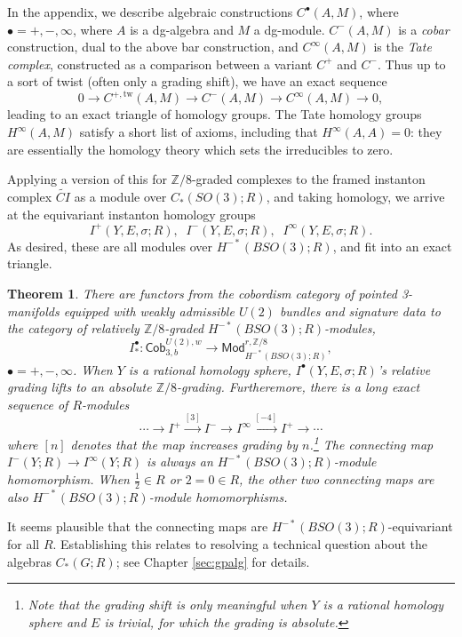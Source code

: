 \documentclass{memo-l}
\newtheorem{theorem}{Theorem}[chapter]
\theoremstyle{definition}
\theoremstyle{remark}
\numberwithin{section}{chapter}
\numberwithin{equation}{chapter}
\begin{document}
In the appendix, we describe algebraic constructions $C^\bullet(A,M)$, where $\bullet = +, -, \infty$, where $A$ is a dg-algebra and $M$ a dg-module. $C^-(A,M)$ is a \emph{cobar} construction, dual to the above bar construction, and $C^\infty(A,M)$ is the \emph{Tate complex}, constructed as a comparison between a variant $C^+$ and $C^-$. Thus up to a sort of twist (often only a grading shift), we have an exact sequence $$0 \to C^{+,\text{tw}}(A,M) \to C^-(A,M) \to C^\infty(A,M) \to 0,$$ leading to an exact triangle of homology groups. The Tate homology groups $H^\infty(A,M)$ satisfy a short list of axioms, including that $H^\infty(A,A) = 0$: they are essentially the homology theory which sets the irreducibles to zero.

Applying a version of this for $\mathbb Z/8$-graded complexes to the framed instanton complex $\widetilde{CI}$ as a module over $C_*(SO(3);R)$, and taking homology, we arrive at the equivariant instanton homology groups $$I^+(Y,E,\sigma;R),\;\; I^-(Y,E,\sigma;R),\;\; I^\infty(Y,E,\sigma;R).$$ As desired, these are all modules over $H^{-*}(BSO(3);R)$, and fit into an exact triangle. 

\begin{theorem}There are functors from the cobordism category of pointed 3-manifolds equipped with weakly admissible $U(2)$ bundles and signature data to the category of relatively $\mathbb Z/8$-graded $H^{-*}(BSO(3);R)$-modules, $$I^\bullet_*: \mathsf{Cob}_{3,b}^{U(2),w} \to \mathsf{Mod}^{r,\mathbb Z/8}_{H^{-*}(BSO(3);R)},$$ $\bullet = +, -, \infty$. When $Y$ is a rational homology sphere, $I^\bullet(Y,E,\sigma;R)$'s relative grading lifts to an absolute $\mathbb Z/8$-grading. Furtheremore, there is a long exact sequence of $R$-modules $$\cdots \to I^+ \xrightarrow{[3]} I^- \to I^\infty \xrightarrow{[-4]} I^+ \to \cdots$$ where $[n]$ denotes that the map increases grading by $n$.\footnote{Note that the grading shift is only meaningful when $Y$ is a rational homology sphere and $E$ is trivial, for which the grading is absolute.} The connecting map $I^-(Y;R) \to I^\infty(Y;R)$ is always an $H^{-*}(BSO(3);R)$-module homomorphism. When $\frac 12 \in R$ or $2 = 0 \in R$, the other two connecting maps are also $H^{-*}(BSO(3);R)$-module homomorphisms.\end{theorem}

It seems plausible that the connecting maps are $H^{-*}(BSO(3);R)$-equivariant for all $R$. Establishing this relates to resolving a technical question about the algebras $C_*(G;R)$; see Chapter \ref{sec:gpalg} for details. \\
\end{document}
